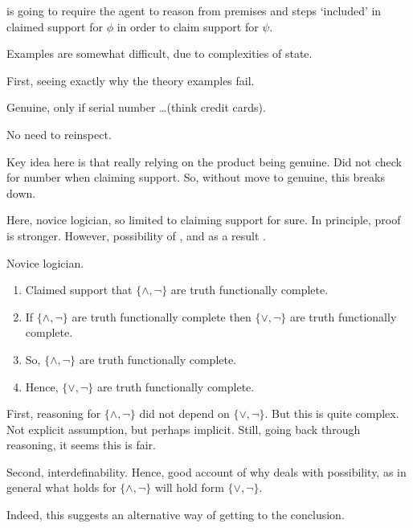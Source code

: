 \begin{note}
  \ESU{} is going to require the agent to reason from premises and steps `included' in claimed support for \(\phi\) in order to claim support for \(\psi\).
\end{note}

\begin{note}[Examples]
  Examples are somewhat difficult, due to complexities of state.
\end{note}

\begin{note}
  First, seeing exactly why the theory examples fail.
\end{note}

\begin{note}
  \begin{illustration}
    \label{illu:number-check}
    Genuine, only if serial number \dots (think credit cards).
  \end{illustration}
  No need to reinspect.

  Key idea here is that really relying on the product being genuine.
  Did not check for number when claiming support.
  So, without move to genuine, this breaks down.
\end{note}

\begin{note}[Logician]
  Here, novice logician, so limited to claiming support for sure.
  In principle, proof is stronger.
  However, possibility of \mistaken{}, and as a result \misled{}.
  \begin{illustration}\label{illu:CS:tfc}
    Novice logician.
    \begin{enumerate}
    \item Claimed support that \(\{\land,\lnot\}\) are truth functionally complete.
    \item If \(\{\land,\lnot\}\) are truth functionally complete then \(\{\lor,\lnot\}\) are truth functionally complete.
    \item So, \(\{\land,\lnot\}\) are truth functionally complete.
    \item Hence, \(\{\lor,\lnot\}\) are truth functionally complete.
    \end{enumerate}
  \end{illustration}

  First, reasoning for \(\{\land,\lnot\}\) did not depend on \(\{\lor,\lnot\}\).
  But this is quite complex.
  Not explicit assumption, but perhaps implicit.
  Still, going back through reasoning, it seems this is fair.

  Second, interdefinability.
  Hence, good account of why deals with possibility, as in general what holds for \(\{\land,\lnot\}\) will hold form \(\{\lor,\lnot\}\).

  Indeed, this suggests an alternative way of getting to the conclusion.
\end{note}

